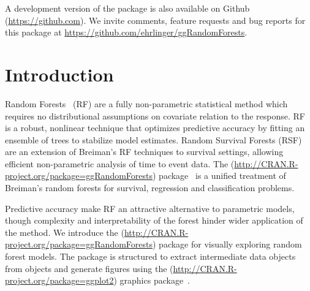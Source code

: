 \documentclass[nojss]{jss}\usepackage[]{graphicx}\usepackage[]{color}
\begin{document}
A development version of the  package is also available on Github (\url{https://github.com}). We invite comments, feature requests and bug reports for this package at \url{https://github.com/ehrlinger/ggRandomForests}.

\section{Introduction} \label{S:introduction}

Random Forests~\citep{Breiman:2001} (RF) are a fully non-parametric statistical method which requires no distributional assumptions on covariate relation to the response. RF is a robust, nonlinear technique that optimizes predictive accuracy by fitting an ensemble of trees to stabilize model estimates. Random Survival Forests (RSF)~\citep{Ishwaran:2007a,Ishwaran:2008} are an extension of Breiman's RF techniques to survival settings, allowing efficient non-parametric analysis of time to event data. The  (\url{http://CRAN.R-project.org/package=ggRandomForests}) package~\citep{Ishwaran:RFSRC:2014} is a unified treatment of Breiman's random forests for survival, regression and classification problems.

Predictive accuracy make RF an attractive alternative to parametric models, though complexity and interpretability of the forest hinder wider application of the method. We introduce the  (\url{http://CRAN.R-project.org/package=ggRandomForests}) package for visually exploring random forest models. The  package is structured to extract intermediate data objects from  objects and generate figures using the  (\url{http://CRAN.R-project.org/package=ggplot2}) graphics package~\citep{Wickham:2009}.
\end{document}
